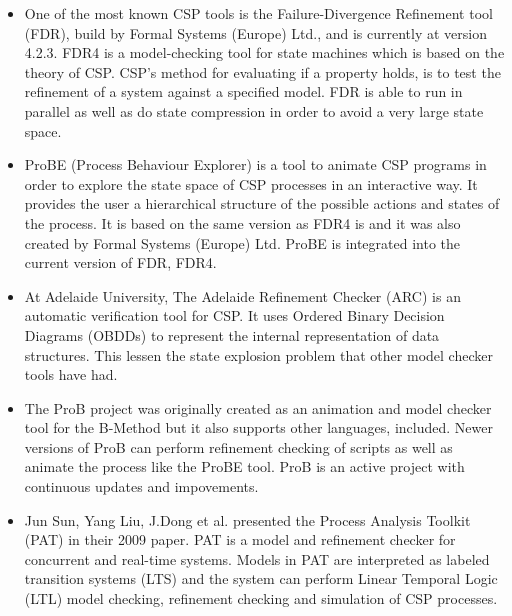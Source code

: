 \begin{itemize}
\item One of the most known CSP tools is the Failure-Divergence Refinement tool (FDR), build by Formal Systems (Europe) Ltd., and is currently at version 4.2.3\cite{fdr}. FDR4 is a model-checking tool for state machines which is based on the theory of CSP. CSP's method for evaluating if a property holds, is to test the refinement of a system against a specified model.
FDR is able to run in parallel as well as do state compression in order to avoid a very large state space.
\item ProBE (Process Behaviour Explorer)\cite{probe} is a tool to animate CSP programs in order to explore the state space of CSP processes in an interactive way. It provides the user a hierarchical structure of the possible actions and states of the process. It is based on the same \cspm{} version as FDR4 is and it was also created by Formal Systems (Europe) Ltd. ProBE is integrated into the current version of FDR, FDR4.
\item At Adelaide University, The Adelaide Refinement Checker (ARC)\cite{Parashkevov1996} is an automatic verification tool for CSP. It uses Ordered Binary Decision Diagrams (OBDDs) to represent the internal representation of data structures. This lessen the state explosion problem that other model checker tools have had.
\item The ProB project\cite{ProB}\cite{Leuschel2003} was originally created as an animation and model checker tool for the B-Method\cite{Abrial1988} but it also supports other languages, \cspm{}  included. Newer versions of ProB can perform refinement checking of \cspm{}  scripts as well as animate the process like the ProBE tool. ProB is an active project with continuous updates and impovements.
\item Jun Sun, Yang Liu, J.Dong et al. presented the Process Analysis Toolkit (PAT) in their 2009 paper\cite{Sun2009}. PAT is a model and refinement checker for concurrent and real-time systems. Models in PAT are interpreted as labeled transition systems (LTS) and the system can perform Linear Temporal Logic (LTL) model checking, refinement checking and simulation of CSP processes.
\end{itemize}

